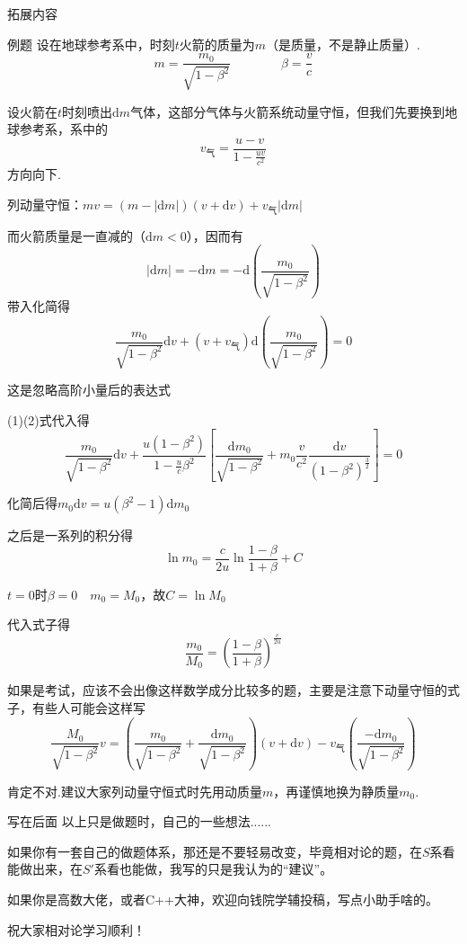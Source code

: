\documentclass[a4paper, opensource]{./template/qyxf-book}
\newcommand{\di}[1]{\mathrm{d}#1}
\begin{document}
\begin{section}{拓展内容}
\begin{subsection}{例题}
\solve 设在地球参考系中，时刻$t$火箭的质量为$m$（是质量，不是静止质量）.
\begin{equation*}
m=\frac{m_0}{\sqrt{1-\beta^2}}\hspace{4em}\beta=\frac{v}{c}
\end{equation*}

设火箭在$t$时刻喷出$\di m$气体，这部分气体与火箭系统动量守恒，但我们先要换到地球参考系，系中的
\begin{equation*}
v_{\mbox{气}}=\frac{u-v}{1-\frac{uv}{c^2}}
\end{equation*}
方向向下.

列动量守恒：$mv=(m-|\di m|)(v+\di v)+v_{\mbox{气}}|\di m|$

而火箭质量是一直减的（$\di m<0$），因而有
\begin{equation}
|\di m|=-\di m=-\di(\frac{m_0}{\sqrt{1-\beta^2}})
\end{equation}
带入化简得
\begin{equation}
\frac{m_0}{\sqrt{1-\beta^2}}\di v+(v+v_{\mbox{气}})\di(\frac{m_0}{\sqrt{1-\beta^2}})=0
\end{equation}

这是忽略高阶小量后的表达式

(1)(2)式代入得
\begin{equation*}
\frac{m_0}{\sqrt{1-\beta^2}}\di v+\frac{u(1-\beta^2)}{1-\frac{u}{c}\beta^2}[\frac{\di m_0}{\sqrt{1-\beta^2}}
+m_0\frac{v}{c^2}\frac{\di v}{(1-\beta^2)^{\frac{3}{2}}}]=0
\end{equation*}

化简后得$m_0\di v=u(\beta^2-1)\di m_0$

之后是一系列的积分得
\begin{equation*}
\ln m_0=\frac{c}{2u}\ln \frac{1-\beta}{1+\beta}+C
\end{equation*}

$t=0$时$\beta=0\hspace{1em}m_0=M_0$，故$C=\ln M_0$

代入式子得
\begin{equation*}
\frac{m_0}{M_0}=(\frac{1-\beta}{1+\beta})^{\frac{c}{2u}}
\end{equation*}

如果是考试，应该不会出像这样数学成分比较多的题，主要是注意下动量守恒的式子，有些人可能会这样写
\begin{equation*}
\frac{M_0}{\sqrt{1-\beta^2}}v=(\frac{m_0}{\sqrt{1-\beta^2}}+\frac{\di m_0}{\sqrt{1-\beta^2}})(v+\di v)
-v_{\mbox{气}}(\frac{-\di m_0}{\sqrt{1-\beta^2}})
\end{equation*}

肯定不对.建议大家列动量守恒式时先用动质量$m$，再谨慎地换为静质量$m_0$.
\end{subsection}
\end{section}

\begin{section}{写在后面}
以上只是做题时，自己的一些想法......

如果你有一套自己的做题体系，那还是不要轻易改变，毕竟相对论的题，在$S$系看能做出来，在$S'$系看也能做，我写的只是我认为的“建议”。

如果你是高数大佬，或者C++大神，欢迎向钱院学辅投稿，写点小助手啥的。

祝大家相对论学习顺利！
\end{section}
\end{document}
